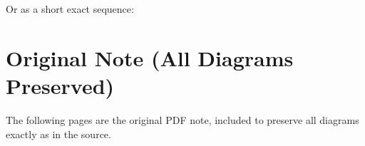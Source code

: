 \documentclass{article}
\begin{document}
\begin{center}
\end{center}

Or as a short exact sequence:
\begin{center}
\end{center}

\appendix
\section{Original Note (All Diagrams Preserved)}

The following pages are the original PDF note, included to preserve all diagrams exactly as in the source.


\end{document}
